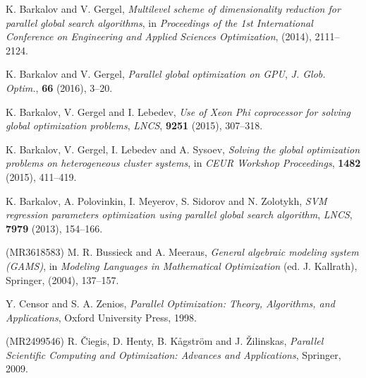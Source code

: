 \documentclass[runningheads]{llncs}
\begin{document}
%
%
% 
% 
%
\begin{thebibliography}{107}


\newblock K. Barkalov and V. Gergel,
\newblock \emph{\emph{Multilevel scheme of dimensionality reduction for parallel global search algorithms}},
\newblock in \emph{Proceedings of the 1st International Conference on Engineering and Applied Sciences Optimization}, (2014), 2111--2124.

\newblock K. Barkalov and V. Gergel,
\newblock \emph{\emph{Parallel global optimization on GPU}},
\newblock \emph{J. Glob. Optim.}, \textbf{66} (2016), 3--20.

\newblock K. Barkalov, V. Gergel and I. Lebedev,
\newblock \emph{\emph{Use of Xeon Phi coprocessor for solving global optimization problems}},
\newblock \emph{LNCS}, \textbf{9251} (2015), 307--318.

\newblock K. Barkalov, V. Gergel, I. Lebedev and A. Sysoev,
\newblock \emph{\emph{Solving the global optimization problems on heterogeneous cluster systems}},
\newblock in \emph{CEUR Workshop Proceedings}, \textbf{1482} (2015), 411--419.

\newblock K. Barkalov, A. Polovinkin, I. Meyerov, S. Sidorov and N. Zolotykh,
\newblock \emph{\emph{SVM regression parameters optimization using parallel global search algorithm}},
\newblock \emph{LNCS}, \textbf{7979} (2013), 154--166.

 (MR3618583)%
\newblock M. R. Bussieck and A. Meeraus,
\newblock \emph{\emph{General algebraic modeling system (GAMS)}},
\newblock in \emph{Modeling Languages in Mathematical Optimization} (ed. J. Kallrath), Springer, (2004), 137--157.

\newblock Y. Censor and S. A. Zenios,
\newblock \emph{Parallel Optimization: Theory, Algorithms, and Applications},
\newblock Oxford University Press, 1998.

 (MR2499546)%
\newblock R. \v Ciegis, D. Henty, B. K\aa gstr\"om and J. \v Zilinskas,
\newblock \emph{Parallel Scientific Computing and Optimization: Advances and Applications},
\newblock Springer, 2009.


\end{thebibliography}
\end{document}
